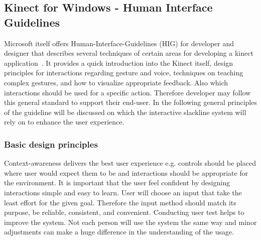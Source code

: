 \subsection{Kinect for Windows - Human Interface Guidelines}\label{2_5_2_kinectHIG}
Microsoft itself offers Human-Interface-Guidelines (HIG) for developer and designer that describes several techniques of certain areas for developing a kinect application~\cite{MicrosoftHIG2014-mh}. It provides a quick introduction into the Kinect itself, design principles for interactions regarding gesture and voice, techniques on teaching complex gestures, and how to visualize appropriate feedback. Also which interactions should be used for a specific action. Therefore developer may follow this general standard to support their end-user. In the following general principles of the guideline will be discussed on which the interactive slackline system will rely on to enhance the user experience. 

\subsubsection{Basic design principles}
Context-awareness delivers the best user experience e.g. controls should be placed where user would expect them to be and interactions should be appropriate for the environment. It is important that the user feel confident by designing interactions simple and easy to learn. User will choose an input that take the least effort for the given goal. Therefore the input method should match its purpose, be reliable, consistent, and convenient. Conducting user test helps to improve the system. Not each person will use the system the same way and minor adjustments can make a huge difference in the understanding of the usage.

